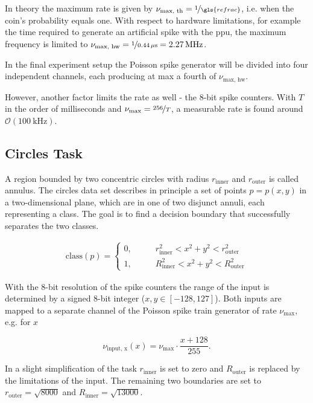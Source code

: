 In theory the maximum rate is given by $\nu_\text{max, th} = \nicefrac{1}{\gls{refrac}}$, i.e. when the coin's probability equals one. With respect to hardware limitations, for example the time required to generate an artificial spike with the \gls{ppu}, the maximum frequency is limited to $\nu_\text{max, hw} = \nicefrac{1}{\SI{0.44}{\mu \s}} = \SI{2.27}{\mega \Hz}$.

In the final experiment setup the Poisson spike generator will be divided into four independent channels, each producing at max a fourth of $\nu_\text{max, hw}$.

However, another factor limits the rate as well - the 8-bit spike counters. With $T$ in the order of milliseconds and $\nu_\text{max} = \nicefrac{256}{T}$, a measurable rate is found around $\mathcal{O}(\SI{100}{\kilo \Hz})$.

\subsection{Circles Task}
\label{circlestask}
A region bounded by two concentric circles with radius $r_{\text{inner}}$ and $r_{\text{outer}}$ is called annulus. The circles data set describes in principle a set of points $p = p(x,y)$ in a two-dimensional plane, which are in one of two disjunct annuli, each representing a class. The goal is to find a decision boundary that successfully separates the two classes.

\begin{align}
\text{class}(p) =
\begin{cases}
0 ,&\quad \quad r_{\text{inner}}^2 < x^2 + y^2 < r_{\text{outer}}^2 \\
1 ,&\quad \quad R_{\text{inner}}^2 < x^2 + y^2 < R_{\text{outer}}^2
\end{cases}
\end{align}

With the 8-bit resolution of the spike counters the range of the input is determined by a signed 8-bit integer ($x, y \in [-128,127]$). Both inputs are mapped to a separate channel of the Poisson spike train generator of rate $\nu_\text{max}$, e.g. for $x$

\begin{equation}\label{inputfrequency}
\nu_{\text{input, x}}(x) = \nu_\text{max} \cdot \frac{x + 128}{255}.
\end{equation}

In a slight simplification of the task $r_{\text{inner}}$ is set to zero and $R_{\text{outer}}$ is replaced by the limitations of the input. The remaining two boundaries are set to $r_{\text{outer}} = \sqrt{8000}$ and $R_{\text{inner}} = \sqrt{13000}$.

